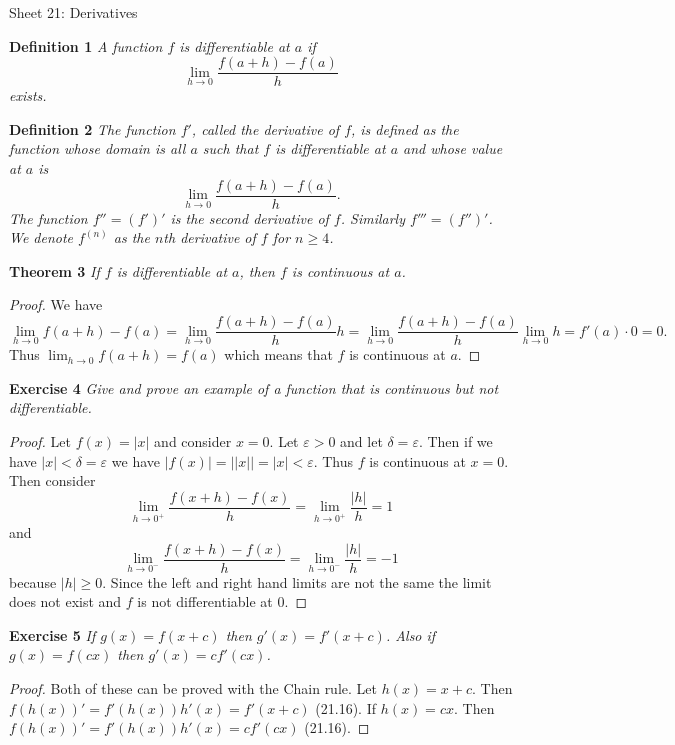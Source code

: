 \documentclass{article}
\begin{document}
\begin{flushleft}

\Large

Sheet 21: Derivatives\newline

\normalsize

\textbf{Definition 1}
\textsl{A function $f$ is differentiable at $a$ if
\[
\lim_{h \rightarrow 0} \frac{f(a+h) - f(a)}{h}
\]
exists.}\newline

\textbf{Definition 2}
\textsl{The function $f'$, called the derivative of $f$, is defined as the function whose domain is all $a$ such that $f$ is differentiable at $a$ and whose value at $a$ is
\[
\lim_{h \rightarrow 0} \frac{f(a+h) - f(a)}{h}.
\]
The function $f'' = (f')'$ is the second derivative of $f$. Similarly $f''' = (f'')'$. We denote $f^{(n)}$ as the $n$th derivative of $f$ for $n \geq 4$.}\newline

\textbf{Theorem 3}
\textsl{If $f$ is differentiable at $a$, then $f$ is continuous at $a$.}
\begin{proof}
We have
\[
\lim_{h \rightarrow 0} f(a+h) - f(a) = \lim_{h \rightarrow 0} \frac{f(a+h) - f(a)}{h} h = \lim_{h \rightarrow 0} \frac{f(a+h) - f(a)}{h} \lim_{h \rightarrow 0} h = f'(a) \cdot 0 = 0.
\]
Thus $\lim_{h \rightarrow 0} f(a + h) = f(a)$ which means that $f$ is continuous at $a$.
\end{proof}

\textbf{Exercise 4}
\textsl{Give and prove an example of a function that is continuous but not differentiable.}
\begin{proof}
Let $f(x) = |x|$ and consider $x = 0$. Let $\varepsilon > 0$ and let $\delta = \varepsilon$. Then if we have $|x| < \delta = \varepsilon$ we have $|f(x)| = ||x|| = |x| < \varepsilon$. Thus $f$ is continuous at $x = 0$. Then consider
\[
\lim_{h \rightarrow 0^+} \frac{f(x+h) - f(x)}{h} = \lim_{h \rightarrow 0^+} \frac{|h|}{h} = 1
\]
and
\[
\lim_{h \rightarrow 0^-} \frac{f(x+h) - f(x)}{h} = \lim_{h \rightarrow 0^-} \frac{|h|}{h} = -1
\]
because $|h| \geq 0$. Since the left and right hand limits are not the same the limit does not exist and $f$ is not differentiable at $0$.
\end{proof}

\textbf{Exercise 5}
\textsl{If $g(x) = f(x+c)$ then $g'(x) = f'(x+c)$. Also if $g(x) = f(cx)$ then $g'(x) = cf'(cx)$.}
\begin{proof}
Both of these can be proved with the Chain rule. Let $h(x) = x+c$. Then $f(h(x))' = f'(h(x))h'(x) = f'(x+c)$ (21.16). If $h(x) = cx$. Then $f(h(x))' = f'(h(x))h'(x) = cf'(cx)$ (21.16).
\end{proof}


\end{flushleft}
\end{document}
